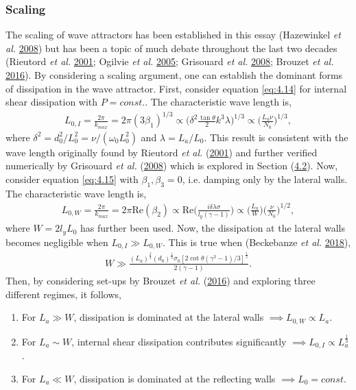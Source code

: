 \documentclass[a4paper]{article}
\numberwithin{equation}{section}
\begin{document}
\subsubsection{Scaling}
The scaling of wave attractors has been established in this essay (Hazewinkel \emph{et al.} \hyperlink{ref 27}{2008}) but has been a topic of much debate throughout the last two decades (Rieutord \emph{et al.} \hyperlink{ref 12}{2001}; Ogilvie \emph{et al.} \hyperlink{ref 13}{2005}; Grisouard \emph{et al.} \hyperlink{ref 25}{2008}; Brouzet \emph{et al.} \hyperlink{ref 26}{2016}). By considering a scaling argument, one can establish the dominant forms of dissipation in the wave attractor. First, consider equation \eqref{eq:4.14} for internal shear dissipation with $P = const.$. The characteristic wave length is, 
\begin{align*}
L_{0, I} = \frac{2\pi}{k_{max}} = 2\pi (3\beta_1)^{1/3} \propto \bigg( \delta^2 \frac{\tan\theta}{2}k^3\lambda \bigg)^{1/3} \propto \bigg(\frac{L_a \nu}{N_0}\bigg)^{1/3},
\end{align*}
where $\delta^2 = d^2_0/L^2_0 = \nu/(\omega_0 L^2_0)$ and $\lambda = L_a/L_0$. This result is consistent with the wave length originally found by Rieutord \emph{et al.} (\hyperlink{ref 12}{2001}) and further verified numerically by Grisouard \emph{et al.} (\hyperlink{ref 25}{2008}) which is explored in Section (\hyperref[sec:4.2]{4.2}). Now, consider equation \eqref{eq:4.15} with $\beta_1, \beta_3 = 0$, i.e. damping only by the lateral walls. The characteristic wave length is, 
\begin{align*}
L_{0, W} = \frac{2\pi}{k_{max}} = 2\pi \text{Re}(\beta_2) \propto \text{Re}\bigg( \frac{i\delta\lambda\sigma}{l_y(\gamma - 1)} \bigg) \propto \bigg(\frac{L_a}{W}\bigg)\bigg(\frac{\nu}{N_0}\bigg)^{1/2},
\end{align*}
where $W = 2l_y L_0$ has further been used. Now, the dissipation at the lateral walls becomes negligible when $L_{0,I} \gg L_{0,W}$. This is true when (Beckebanze \emph{et al.} \hyperlink{ref 8}{2018}), 
\begin{align*}
W \gg \frac{(L_a)^{\frac{2}{3}} (d_0)^{\frac{1}{3}} \sigma_0 [2 \cot \theta (\gamma^3 - 1)/3]^{\frac{1}{3}}}{2(\gamma -1)}.
\end{align*}
Then, by considering set-ups by Brouzet \emph{et al.} (\hyperlink{ref 26}{2016}) and exploring three different regimes, it follows,
\begin{enumerate}
\item For $L_a \gg W$, dissipation is dominated at the lateral walls $\implies L_{0,W} \propto L_a$.
\item For $L_a \sim W$, internal shear dissipation contributes significantly $\implies L_{0,I} \propto L_a^{\frac{1}{3}}$.
\item For $L_a \ll W$, dissipation is dominated at the reflecting walls $\implies L_{0} = const.$
\end{enumerate}
\end{document}
